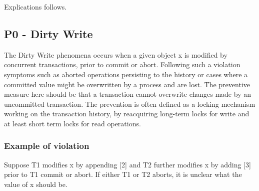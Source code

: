 \documentclass[a4paper,10pt,titlepage]{report}
\begin{document}
Explications follows.
\subsection{P0 - Dirty Write}
The Dirty Write phenomena occurs when a given object x is modified by concurrent transactions, prior to commit or abort. Following such a violation symptoms such as aborted operations persisting to the history or cases where a committed value might be overwritten by a process and are lost. The preventive measure here should be that a transaction cannot overwrite changes made by an uncommitted transaction. The prevention is often defined as a locking mechanism working on the transaction history, by reacquiring long-term locks for write and at least short term locks for read operations.\\
\vspace{5mm}
\subsubsection{Example of violation}
Suppose T1 modifies x by appending [2] and T2 further modifies x by adding [3] prior to T1 commit or abort. If either T1 or T2 aborts, it is unclear what the value of x should be. \\
\end{document}
